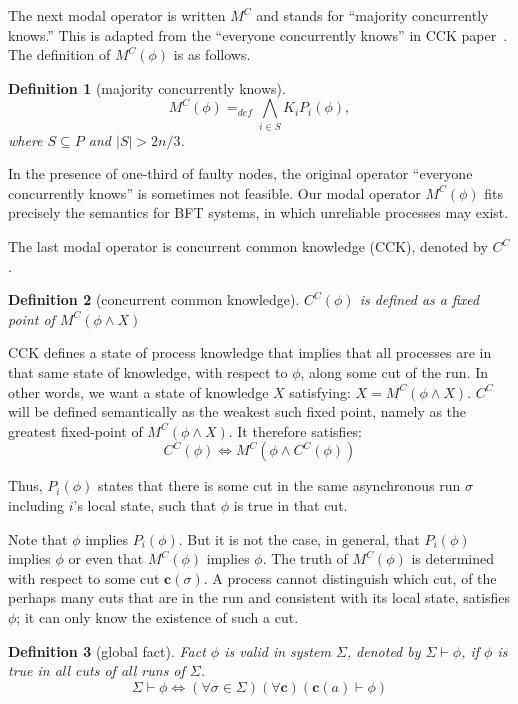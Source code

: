 \documentclass{article}
\newtheorem{defn}{Definition}[section]
\renewcommand{\vec}[1]{\mathbf{#1}}
\begin{document}
The next modal operator is written $M^C$ and stands for ``majority concurrently knows.'' This is adapted from the ``everyone concurrently knows'' in CCK paper~\cite{cck92}.
The definition of $M^C(\phi)$ is as follows.

\begin{defn}[majority concurrently knows]
	$$M^C(\phi) =_{def} \bigwedge_{i \in S} K_i P_i(\phi), $$ where $S \subseteq P$ and $|S| > 2n/3$.	
\end{defn}

In the presence of one-third of faulty nodes, the original operator ``everyone concurrently knows'' is sometimes not feasible.
Our modal operator $M^C(\phi)$ fits precisely the semantics for BFT systems, in which unreliable processes may exist.

The last modal operator is concurrent common knowledge (CCK), denoted by $C^C$.
\begin{defn}[concurrent common knowledge]
	$C^C(\phi)$ is defined as a fixed point of $M^C(\phi \wedge X)$
\end{defn}
CCK defines a state of process knowledge that implies that all processes are in that same state of knowledge, with respect to $\phi$, along some cut of the run. In other words, we want a state of knowledge $X$ satisfying: $X = M^C(\phi \wedge X)$.	
$C^C$ will be defined semantically as the weakest such fixed point, namely as the greatest fixed-point of $M^C(\phi \wedge X)$.
It therefore satisfies:
$$C^C(\phi) \Leftrightarrow  M^C(\phi \wedge C^C(\phi))$$



Thus, $P_i(\phi)$ states that there is some cut in the same asynchronous run $\sigma$ including $i$’s local state, such that $\phi$ is true in that cut.

Note that $\phi$ implies $P_i(\phi)$. But it is not the case, in general, that $P_i(\phi)$ implies $\phi$ or even that $M^C(\phi)$ implies $\phi$. The truth of $M^C(\phi)$ is determined with respect to some cut $\vec{c}(\sigma)$. A process cannot distinguish which cut, of the perhaps many cuts that are in the run and consistent with its local state, satisfies $\phi$; it can only know the existence of such a cut. 

\begin{defn}[global fact]
	Fact $\phi$ is valid in system $\Sigma$, denoted by $\Sigma \vdash \phi$, if $\phi$ is true in all cuts of all runs of $\Sigma$.	
	$$\Sigma \vdash \phi 
	\Leftrightarrow (\forall \sigma \in \Sigma)(\forall\vec{c}) (\vec{c}(a) \vdash \phi)$$
\end{defn} 
\end{document}
